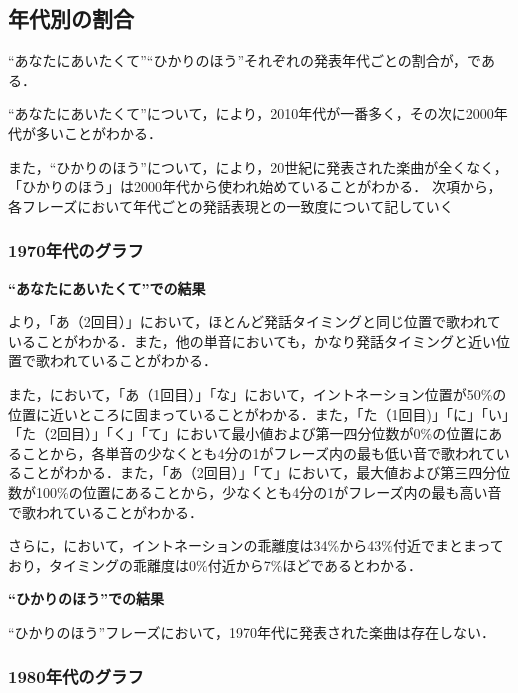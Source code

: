 \subsection{年代別の割合}
“あなたにあいたくて”“ひかりのほう”それぞれの発表年代ごとの割合が，である．


“あなたにあいたくて”について，により，2010年代が一番多く，その次に2000年代が多いことがわかる．\par
また，“ひかりのほう”について，により，20世紀に発表された楽曲が全くなく，「ひかりのほう」は2000年代から使われ始めていることがわかる．
次項から，各フレーズにおいて年代ごとの発話表現との一致度について記していく


\subsubsection{1970年代のグラフ}


\textbf{“あなたにあいたくて”での結果}\par
{}より，「あ（2回目）」において，ほとんど発話タイミングと同じ位置で歌われていることがわかる．また，他の単音においても，かなり発話タイミングと近い位置で歌われていることがわかる．\par
また，において，「あ（1回目）」「な」において，イントネーション位置が50\%の位置に近いところに固まっていることがわかる．また，「た（1回目)」「に」「い」「た（2回目）」「く」「て」において最小値および第一四分位数が0\%の位置にあることから，各単音の少なくとも4分の1がフレーズ内の最も低い音で歌われていることがわかる．また，「あ（2回目）」「て」において，最大値および第三四分位数が100\%の位置にあることから，少なくとも4分の1がフレーズ内の最も高い音で歌われていることがわかる．\par
さらに，において，イントネーションの乖離度は34\%から43\%付近でまとまっており，タイミングの乖離度は0\%付近から7\%ほどであるとわかる．


\textbf{“ひかりのほう”での結果}\par
“ひかりのほう”フレーズにおいて，1970年代に発表された楽曲は存在しない．

\subsubsection{1980年代のグラフ}

